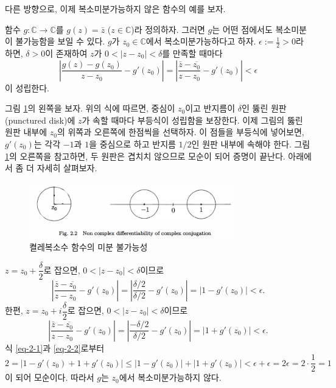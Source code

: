 다른 방향으로, 이제 복소미분가능하지 않은 함수의 예를 보자.

\begin{salt_example} \label{example-2-2}
함수 $g:\mathbb C \to \mathbb C$를 $g(z) = \bar z$ ($z\in\mathbb C$)라 정의하자.
그러면 $g$는 어떤 점에서도 복소미분이 불가능함을 보일 수 있다.
$g$가 $z_0\in\mathbb C$에서 복소미분가능하다고 하자.
$\epsilon:=\frac12 >0$라 하면, $\delta>0$이 존재하여
$z$가 $0<|z-z_0|<\delta$를 만족할 때마다 
\[
\left| \dfrac{g(z)-g(z_0)}{z-z_0} - g'(z_0) \right| 
= \left| \dfrac{\bar z - \overline{z_0}}{z-z_0} - g'(z_0) \right| 
<\epsilon
\]
이 성립한다.

그림 \ref{fig-2-2}의 왼쪽을 보자.
위의 식에 따르면,
중심이 $z_0$이고 반지름이 $\delta$인 뚫린 원판(punctured disk)에 $z$가 속할 때마다
부등식이 성립함을 보장한다.
이제 그림의 뚫린 원판 내부에 $z_0$의 위쪽과 오른쪽에 한점씩을 선택하자.
이 점들을 부등식에 넣어보면, $g'(z_0)$는 각각 $-1$과 $1$을 중심으로 하고 반지름 $1/2$인
원판 내부에 속해야 한다.
그림 \ref{fig-2-2}의 오른쪽을 참고하면, 두 원판은 겹치치 않으므로 모순이 되어 증명이 끝난다.
아래에서 좀 더 자세히 살펴보자.

\begin{figure}[!h]
\begin{center}
\includegraphics[width=0.8\textwidth]{./SaltChapter/fig-2-2}
\end{center}
\caption{켤레복소수 함수의 미분 불가능성}
\label{fig-2-2}
\end{figure}

$z=z_0+ \dfrac\delta2$로 잡으면, $0<|z-z_0|<\delta$이므로
\begin{equation} \label{eq-2-1}
\left| \dfrac{\bar z - \overline{z_0}}{z-z_0} - g'(z_0) \right| 
= \left| \dfrac{\delta/2}{\delta/2} - g'(z_0) \right| 
= | 1 - g'(z_0)| < \epsilon.
\end{equation}
한편, $z=z_0+ i\dfrac\delta2$로 잡으면, $0<|z-z_0|<\delta$이므로
\begin{equation} \label{eq-2-2}
\left| \dfrac{\bar z - \overline{z_0}}{z-z_0} - g'(z_0) \right| 
= \left| \dfrac{-\delta/2}{\delta/2} - g'(z_0) \right| 
= | 1 + g'(z_0)| < \epsilon.
\end{equation}
식 \eqref{eq-2-1}과 \eqref{eq-2-2}로부터
\[
2 = | 1- g'(z_0) + 1+ g'(z_0)|
\le |1-g'(z_0)| + |1+g'(z_0)| < \epsilon + \epsilon 
= 2\epsilon = 2\cdot\dfrac12 = 1
\]
이 되어 모순이다.
따라서 $g$는 $z_0$에서 복소미분가능하지 않다.
\end{salt_example}

